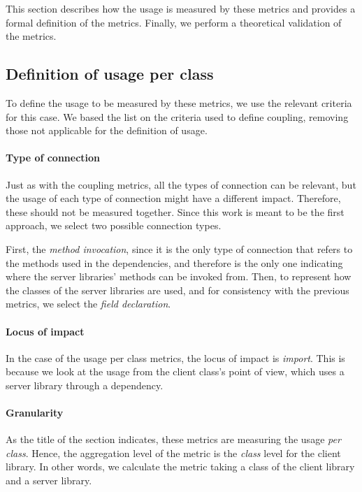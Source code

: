 This section describes how the usage is measured by these metrics and provides a formal definition of the metrics. Finally, we perform a theoretical validation of the metrics.

\subsection{Definition of usage per class}
To define the usage to be measured by these metrics, we use the relevant criteria for this case. We based the list on the criteria used to define coupling, removing those not applicable for the definition of usage.

\paragraph{Type of connection}
Just as with the coupling metrics, all the types of connection can be relevant, but the usage of each type of connection might have a different impact. Therefore, these should not be measured together. Since this work is meant to be the first approach, we select two possible connection types.

First, the \textit{method invocation}, since it is the only type of connection that refers to the methods used in the dependencies, and therefore is the only one indicating where the server libraries' methods can be invoked from. Then, to represent how the classes of the server libraries are used, and for consistency with the previous metrics, we select the \textit{field declaration}.

\paragraph{Locus of impact}

In the case of the usage per class metrics, the locus of impact is \textit{import}. This is because we look at the usage from the client class's point of view, which uses a server library through a dependency.

\paragraph{Granularity}

As the title of the section indicates, these metrics are measuring the usage \textit{per class}. Hence, the aggregation level of the metric is the \textit{class} level for the client library. In other words, we calculate the metric taking a class of the client library and a server library.

